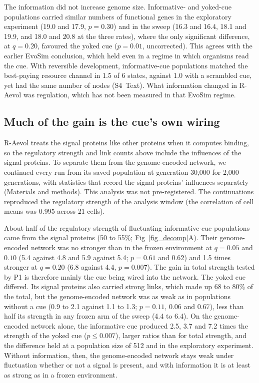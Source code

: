 \documentclass[10pt,letterpaper]{article}
\begin{document}
The information did not increase genome size. Informative- and yoked-cue
populations carried similar numbers of functional genes in the exploratory
experiment (19.0 and 17.9, $p=0.30$) and in the sweep (16.3 and 16.4, 18.1 and
19.9, and 18.0 and 20.8 at the three rates), where the only significant
difference, at $q=0.20$, favoured the yoked cue ($p=0.01$, uncorrected). This agrees with the
earlier EvoSim conclusion, which held even in a regime in which organisms read
the cue. With reversible development, informative-cue populations matched the
best-paying resource channel in 1.5 of 6 states, against 1.0 with a scrambled
cue, yet had the same number of nodes (S4~Text). What information changed in
R-Aevol was regulation, which has not been measured in that EvoSim regime.

\subsection*{Much of the gain is the cue's own wiring}

R-Aevol treats the signal proteins like other proteins when it computes binding,
so the regulatory strength and link counts above include the influences of the
signal proteins. To separate them from the genome-encoded network, we continued
every run from its saved population at generation 30{,}000 for 2{,}000
generations, with statistics that record the signal proteins' influences
separately (Materials and methods). This analysis was not pre-registered. The
continuations reproduced the regulatory strength of the analysis window (the
correlation of cell means was 0.995 across 21 cells).

About half of the regulatory strength of fluctuating informative-cue populations
came from the signal proteins (50 to 55\%; Fig~\ref{fig_decomp}A). Their
genome-encoded network was no stronger than in the frozen environment at
$q=0.05$ and $0.10$ (5.4 against 4.8 and 5.9 against 5.4; $p=0.61$ and $0.62$) and
1.5 times stronger at $q=0.20$ (6.8 against 4.4, $p=0.007$). The gain in total
strength tested by P1 is therefore mainly the cue being wired into the network.
The yoked cue differed. Its signal proteins also carried strong links, which made
up 68 to 80\% of the total, but the genome-encoded network was as weak as in
populations without a cue (0.9 to 2.1 against 1.1 to 1.3; $p=0.11$, $0.06$ and
$0.67$), less than half its strength in any frozen arm of the sweep (4.4 to 6.4). On the
genome-encoded network alone, the informative cue produced 2.5, 3.7 and 7.2 times
the strength of the yoked cue ($p\le 0.007$), larger ratios than for total
strength, and the difference held at a population size of 512 and in the
exploratory experiment. Without information, then, the genome-encoded network
stays weak under fluctuation whether or not a signal is present, and with
information it is at least as strong as in a frozen environment.
\end{document}
